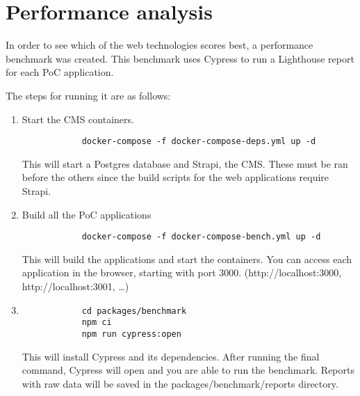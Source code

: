 \chapter{Performance analysis}

\label{Chapter4} 


In order to see which of the web technologies scores best, a performance benchmark was created. 
This benchmark uses Cypress to run a Lighthouse report for each PoC application.

The steps for running it are as follows:

\begin{enumerate}
	\item Start the CMS containers.
	      \begin{verbatim}
			docker-compose -f docker-compose-deps.yml up -d
	      \end{verbatim}
	      This will start a Postgres database and Strapi, the CMS. These must be ran before the others since the build scripts for the web applications require Strapi.
	\item Build all the PoC applications
	      	      	      	      	      	      	      	      	      	      	      	      	      	      	      	      	      	      	      	
	      \begin{verbatim}
			docker-compose -f docker-compose-bench.yml up -d
	      \end{verbatim}
	      This will build the applications and start the containers. 
	      You can access each application in the browser, starting with port 3000. (http://localhost:3000, http://localhost:3001, \dots)
	      	      	      	      	      	      	      	      	      	      	      	      	      	      	      	      	      	      	      
	\item  
	      	      	      	      	      	      	      	      	      	      	      	      	      	      	      	      	      
	      \begin{verbatim}
			cd packages/benchmark
			npm ci
			npm run cypress:open
	      \end{verbatim}
	      	      	      	      	      	      	      	      	      	      	      	      	      	      	      	      	      
	      This will install Cypress and its dependencies. 
	      After running the final command, Cypress will open and you are able to run the benchmark.
	      Reports with raw data will be saved in the packages/benchmark/reports directory.
\end{enumerate}

